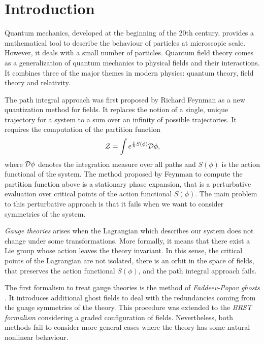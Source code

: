 \chapter*{Introduction}
\label{chap:intro}



Quantum mechanics, developed at the beginning of the 20th century, provides a mathematical tool to describe the behaviour of particles at microscopic scale.
However, it deals with a small number of particles.
Quantum field theory \cite{Intro_QFT} comes as a generalization of quantum mechanics to physical fields and their interactions.
It combines three of the major themes in modern physics: quantum theory, field theory and relativity.

The path integral approach was first proposed by Richard Feynman \cite{Feynman} as a new quantization method for fields.
It replaces the notion of a single, unique trajectory for a system to a sum over an infinity of possible trajectories.
It requires the computation of the partition function
\begin{equation*}
    \mathcal{Z} = \int e^{\frac{i}{\hbar}S(\phi)} \mathcal{D}\phi ,
\end{equation*}
where $\mathcal{D} \phi$ denotes the integration measure over all paths and $S(\phi)$ is the action functional of the system.
The method proposed by Feynman to compute the partition function above is a stationary phase expansion, that is a perturbative evaluation over critical points of the action functional $S(\phi)$.
The main problem to this perturbative approach is that it fails when we want to consider symmetries of the system.

\emph{Gauge theories} arises when the Lagrangian which describes our system does not change under some transformations.
More formally, it means that there exist a Lie group whose action leaves the theory invariant.
In this sense, the critical points of the Lagrangian are not isolated, there is an orbit in the space of fields, that preserves the action functional $S(\phi)$, and the path integral approach fails.

The first formalism to treat gauge theories is the method of \emph{Faddeev-Popov ghosts} \cite{Popov}.
It introduces additional ghost fields to deal with the redundancies coming from the guage symmetries of the theory.
This procedure was extended to the \emph{BRST formalism} \cite{BRST_1, BRST_2} considering a graded configuration of fields.
Nevertheless, both methods fail to consider more general cases where the theory has some natural nonlinear behaviour.

